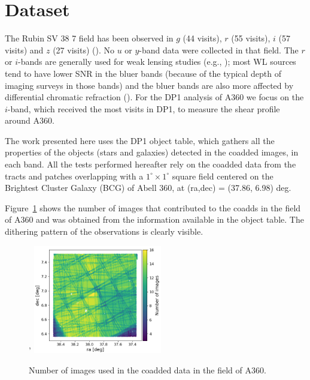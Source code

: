 \documentclass[SE,lsstdraft,authoryear,toc]{lsstdoc}
\begin{document}
\section{Dataset}
\label{sec:data}
The Rubin SV 38 7 field has been observed in $g$ (44 visits), $r$ (55 visits), $i$ (57 visits) and $z$ (27 visits) (). No $u$ or $y$-band data were collected in that field. The $r$ or $i$-bands are generally used for weak lensing studies (e.g., \citealp{2018MNRAS.481.3170M}); most WL sources tend to have lower SNR in the bluer bands (because of the typical depth of imaging surveys in those bands) and the bluer bands are also more affected by differential chromatic refraction (). For the DP1 analysis of A360 we focus on the $i$-band, which received the most visits in DP1, to measure the shear profile around A360. 

The work presented here uses the DP1 object table, which gathers all the properties of the objects (stars and galaxies) detected in the coadded images, in each band.
All the tests performed hereafter rely on the coadded data from the tracts and patches overlapping with a $1^\circ \times 1^\circ$ square field centered on the Brightest Cluster Galaxy (BCG) of Abell 360, at (ra,dec) = (37.86, 6.98) deg. 


 Figure~\ref{fig:dither} shows the number of images that contributed to the coadds in the field of A360 and was obtained from the  information available in the object table. The dithering pattern of the observations is clearly visible. 


\begin{figure}
\centering'
\includegraphics[width=0.5\textwidth]{Figures/nimages.png}
\caption{Number of images used in the coadded data in the field of A360.\label{fig:dither}}
\end{figure}
\end{document}
